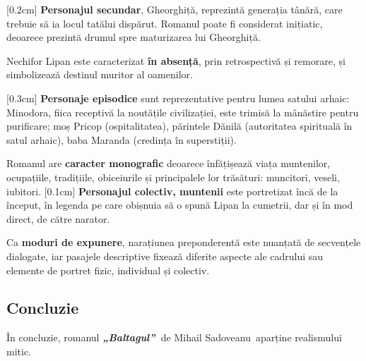 \documentclass[
12pt,
a4paper
]{article}
\newcommand{\operatitle}{\textbf{\textit{„Baltagul”\ }}} %
\newcommand{\operaauthor}{Mihail Sadoveanu\ } %
\begin{document}
[0.2cm]
\textbf{Personajul secundar}, Gheorghiță, reprezintă generația tânără, care trebuie să ia locul tatălui dispărut. Romanul poate fi considerat inițiatic, deoarece prezintă drumul spre maturizarea lui Gheorghiță.

Nechifor Lipan este caracterizat \textbf{în absență}, prin retrospectivă și remorare, și simbolizează destinul muritor al oamenilor.

[0.3cm]
\textbf{Personaje episodice} sunt reprezentative pentru lumea satului arhaic: Minodora, fiica receptivă la noutățile civilizației, este trimisă la mânăstire pentru purificare; moș Pricop (ospitalitatea), părintele Dănilă (autoritatea spirituală în satul arhaic), baba Maranda (credința în superstiții).

Romanul are \textbf{caracter monografic} deoarece înfățișează viața muntenilor, o\-cu\-pa\-ți\-i\-le, tradițiile, obiceiurile și principalele lor trăsături: muncitori, veseli, iubitori.
[0.1cm]
\textbf{Personajul colectiv, muntenii} este portretizat încă de la început, în legenda pe care obișnuia să o spună Lipan la cumetrii, dar și în mod direct, de către narator.

Ca \textbf{moduri de expunere}, narațiunea preponderentă este nuanțată de secvențele dialogate, iar pasajele descriptive fixează diferite aspecte ale cadrului sau elemente de portret fizic, individual și colectiv.

\subsection{Concluzie}
În concluzie, romanul \operatitle de \operaauthor aparține realismului mitic.
\end{document}
